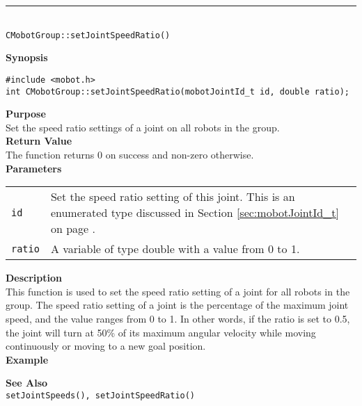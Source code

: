 \noindent
\vspace{5pt}
\rule{4.5in}{0.015in}\\
\noindent
{\LARGE \texttt{CMobotGroup::setJointSpeedRatio()}}\\
{}

\noindent
{\bf Synopsis}
\vspace{-8pt}
\begin{verbatim}
#include <mobot.h>
int CMobotGroup::setJointSpeedRatio(mobotJointId_t id, double ratio);
\end{verbatim}

\noindent
{\bf Purpose}\\
Set the speed ratio settings of a joint on all robots in the group.\\

\noindent
{\bf Return Value}\\
The function returns 0 on success and non-zero otherwise.\\

\noindent
{\bf Parameters}
\vspace{-0.1in}
\begin{description}
\item               
\begin{tabular}{p{10 mm}p{145 mm}}
\texttt{id} & Set the speed ratio setting of this joint. This is an 
enumerated type discussed in Section \ref{sec:mobotJointId_t} on page
\pageref{sec:mobotJointId_t}.\\
\texttt{ratio} & A variable of type double with a value from 0 to 1. 
\end{tabular}
\end{description}

\noindent
{\bf Description}\\
This function is used to set the speed ratio setting of a joint for all robots in the group. The speed
ratio setting of a joint is the percentage of the maximum joint speed, and the
value ranges from 0 to 1. In other words, if the ratio is set to 0.5, the joint 
will turn at 50\% of its maximum angular velocity while moving continuously
or moving to a new goal position.\\

\noindent
{\bf Example}\\
\noindent

\noindent
{\bf See Also}\\
\texttt{setJointSpeeds(), setJointSpeedRatio()}

